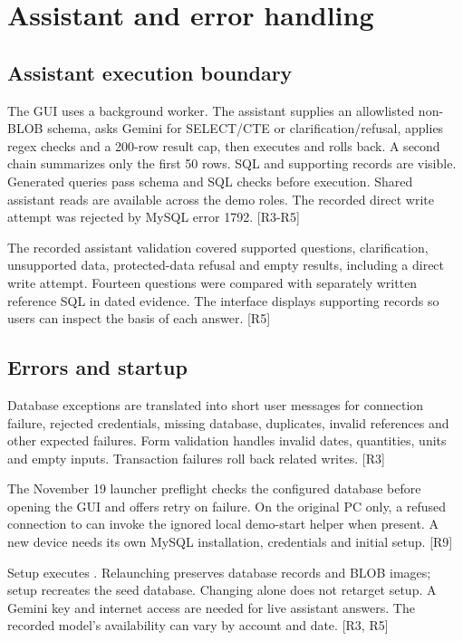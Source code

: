 \documentclass[12pt,a4paper]{report}
\begin{document}
\chapter{Assistant and error handling}

\section{Assistant execution boundary}
The GUI uses a background worker. The assistant supplies an allowlisted non-BLOB schema, asks Gemini for SELECT/\allowbreak{}CTE or clarification/\allowbreak{}refusal, applies regex checks and a 200-row result cap, then executes  and rolls back. A second chain summarizes only the first 50 rows. SQL and supporting records are visible. Generated queries pass schema and SQL checks before execution. Shared assistant reads are available across the demo roles. The recorded direct write attempt was rejected by MySQL error 1792. [R3-R5]


The recorded assistant validation covered supported questions, clarification, unsupported data, protected-data refusal and empty results, including a direct write attempt. Fourteen questions were compared with separately written reference SQL in dated evidence. The interface displays supporting records so users can inspect the basis of each answer. [R5]

\section{Errors and startup}
Database exceptions are translated into short user messages for connection failure, rejected credentials, missing database, duplicates, invalid references and other expected failures. Form validation handles invalid dates, quantities, units and empty inputs. Transaction failures roll back related writes. [R3]

The November 19 launcher preflight checks the configured database before opening the GUI and offers retry on failure. On the original PC only, a refused connection to  can invoke the ignored local demo-start helper when present. A new device needs its own MySQL installation, credentials and initial setup.  [R9]

Setup executes . Relaunching preserves database records and BLOB images; setup recreates the seed database. Changing  alone does not retarget setup. A Gemini key and internet access are needed for live assistant answers. The recorded model's availability can vary by account and date. [R3, R5]
\end{document}
